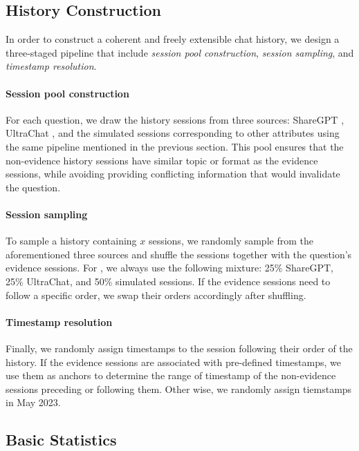 \subsection{History Construction}
\label{appendix-haystack-sampling}

In order to construct a coherent and freely extensible chat history, we design a three-staged pipeline that include \textit{session pool construction}, \textit{session sampling}, and \textit{timestamp resolution}.

\paragraph{Session pool construction} For each question, we draw the history sessions from three sources: ShareGPT \citep{zheng2023judging}, UltraChat \citep{ ding2023enhancing}, and the simulated sessions corresponding to other attributes using the same pipeline mentioned in the previous section. This pool ensures that the non-evidence history sessions have similar topic or format as the evidence sessions, while avoiding providing conflicting information that would invalidate the question. 


\paragraph{Session sampling} To sample a history containing $x$ sessions, we randomly sample from the aforementioned three sources and shuffle the sessions together with the question's evidence sessions. For \BENCHMARK{}, we always use the following mixture: 25\% ShareGPT, 25\% UltraChat, and 50\% simulated sessions. If the evidence sessions need to follow a specific order, we swap their orders accordingly after shuffling. 

\paragraph{Timestamp resolution} Finally, we randomly assign timestamps to the session following their order of the history. If the evidence sessions are associated with pre-defined timestamps, we use them as anchors to determine the range of timestamp of the non-evidence sessions preceding or following them. Other wise, we randomly assign tiemstamps in May 2023. 
 

\subsection{Basic Statistics}
\label{appendix-basic-statistics}

